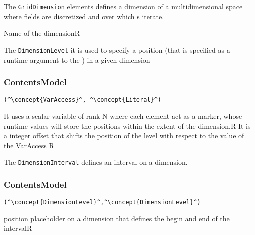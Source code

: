 
The {\tt GridDimension} elements defines a dimension of a multidimensional space where fields are discretized and over which s iterate.

\HIRContentsModel{ () }

\begin{HIRAttributes}
	{Name of the dimension}{R}
\end{HIRAttributes}


The {\tt DimensionLevel} it is used to specify a position (that is specified as a runtime argument to the ) in a given dimension

\subsubsection*{ContentsModel}{}

\begin{lstlisting}[style=default,frame=none]
(^\concept{VarAccess}^, ^\concept{Literal}^)
\end{lstlisting}

\begin{HIRChildElements}
	{It uses a scalar variable of rank N where each element act as a marker, whose runtime values will store the positions within the extent of the dimension.}{R}
	{It is a integer offset that shifts the position of the level with respect to the value of the VarAccess }{R}
\end{HIRChildElements}


The {\tt DimensionInterval} defines an interval on a dimension.

\subsubsection*{ContentsModel}{}

\begin{lstlisting}[style=default,frame=none]
(^\concept{DimensionLevel}^,^\concept{DimensionLevel}^)
\end{lstlisting}

\begin{HIRChildElements}
	{position placeholder on a dimension that defines the begin and end of the interval}{R}
\end{HIRChildElements}

